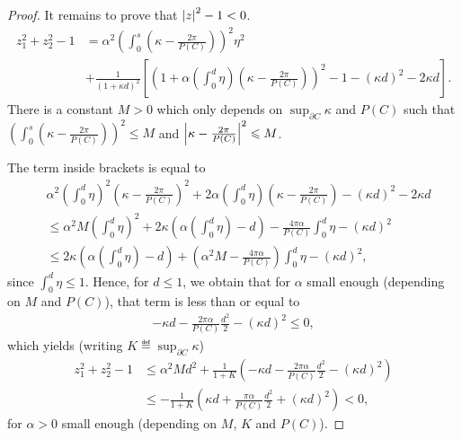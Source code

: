\begin{proof}
It remains to prove that $\left| z \right|^2-1<0$.
\begin{align*}
  z_1^2+z_2^2-1&= \alpha^2 \left(\int_0^s (\kappa-\frac{2\pi}{P(C)})\right)^2\eta^2 \\
               &+ \frac{1}{(1+\kappa d)^2}\left[\left(1+\alpha \left(\int_0^d \eta\right)\left(\kappa- \frac{2\pi}{P(C)}\right)\right)^2 -1 - (\kappa d)^2-2\kappa d\right].
\end{align*}
There is a constant $M>0$ which only depends on $\sup_{\partial C} \kappa$ and $P(C)$ such that $\left(\int_0^s (\kappa-\frac{2\pi}{P(C)})\right)^2\leq M$ and $\left| \kappa-\frac{2\pi}{P(C)} \right|^2\leqslant M$.

The term inside brackets is equal to 
\begin{align*}
  &\alpha^2 \left(\int_0^d \eta\right)^2\left(\kappa- \frac{2\pi}{P(C)}\right)^2 +2\alpha \left(\int_0^d \eta\right)\left(\kappa- \frac{2\pi}{P(C)}\right)- (\kappa d)^2-2\kappa d\\
  &\leq \alpha^2 M \left(\int_0^d \eta\right)^2 + 2\kappa \left( \alpha \left(\int_0^d \eta\right) -d \right) - \frac{4\pi \alpha}{P(C)} \int_0^d\eta - (\kappa d)^2 \\
  &\leq  2\kappa \left( \alpha \left(\int_0^d \eta\right) -d \right) +  \left(\alpha^2 M - \frac{4\pi \alpha}{P(C)}\right) \int_0^d\eta - (\kappa d)^2,
\end{align*}
since $\int_0^d\eta\leq 1$.
Hence, for $d\leq 1$, we obtain that for $\alpha$ small enough (depending on $M$ and $P(C)$), that term is less than or equal to
\begin{align*}
-\kappa d  - \frac{2\pi \alpha}{P(C)}\frac{d^2}{2} - (\kappa d)^2\leq 0,
\end{align*}
which yields (writing $K\eqdef \sup_{\partial C} \kappa$)
\begin{align}
  z_1^2+z_2^2-1&\leq \alpha^2 M d^2 + \frac{1}{1+K}\left(-\kappa d  - \frac{2\pi \alpha}{P(C)}\frac{d^2}{2} - (\kappa d)^2\right)\nonumber\\
               &\leq - \frac{1}{1+K}\left(\kappa d + \frac{\pi \alpha}{P(C)}\frac{d^2}{2}+(\kappa d)^2 \right) <0\label{eq:convexUpBound},
\end{align}
for $\alpha>0$ small enough (depending on $M$, $K$ and $P(C)$).


\end{proof}
